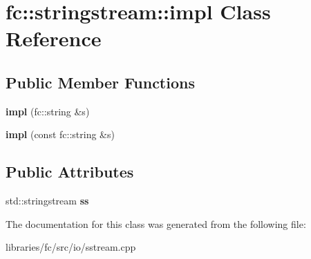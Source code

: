 \hypertarget{classfc_1_1stringstream_1_1impl}{}\section{fc\+:\+:stringstream\+:\+:impl Class Reference}
\label{classfc_1_1stringstream_1_1impl}
\subsection*{Public Member Functions}
\begin{DoxyCompactItemize}
\item 
\mbox{\label{classfc_1_1stringstream_1_1impl_a5e91e8aebb2129da4e9174552bc98681}} 
{\bfseries impl} (fc\+::string \&s)
\item 
\mbox{\label{classfc_1_1stringstream_1_1impl_a104bc6d6f4921da5db82763b42d37739}} 
{\bfseries impl} (const fc\+::string \&s)
\end{DoxyCompactItemize}
\subsection*{Public Attributes}
\begin{DoxyCompactItemize}
\item 
\mbox{\label{classfc_1_1stringstream_1_1impl_a9605518d5160cc992dd260e494c867df}} 
std\+::stringstream {\bfseries ss}
\end{DoxyCompactItemize}


The documentation for this class was generated from the following file\+:\begin{DoxyCompactItemize}
\item 
libraries/fc/src/io/sstream.\+cpp\end{DoxyCompactItemize}
